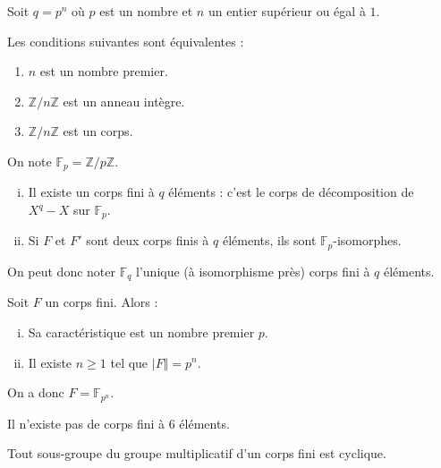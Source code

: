	Soit $q = p^n$ où $p$ est un nombre et $n$ un entier supérieur ou égal à $1$.


	\begin{proposition}
		Les conditions suivantes sont équivalentes :
		\begin{enumerate}
			\item $n$ est un nombre premier.
			\item $\mathbb{Z}/n\mathbb{Z}$ est un anneau intègre.
			\item $\mathbb{Z}/n\mathbb{Z}$ est un corps.
		\end{enumerate}
	\end{proposition}

	\begin{notation}
		On note $\mathbb{F}_p = \mathbb{Z}/p\mathbb{Z}$.
	\end{notation}


	\begin{theorem}
		\begin{enumerate}[(i)]
			\item Il existe un corps fini à $q$ éléments : c'est le corps de décomposition de $X^q - X$ sur $\mathbb{F}_p$.
			\item Si $F$ et $F'$ sont deux corps finis à $q$ éléments, ils sont $\mathbb{F}_p$-isomorphes.
		\end{enumerate}
		On peut donc noter $\mathbb{F}_q$ l'unique (à isomorphisme près) corps fini à $q$ éléments.
	\end{theorem}


	\begin{theorem}
		Soit $F$ un corps fini. Alors :
		\begin{enumerate}[(i)]
			\item Sa caractéristique est un nombre premier $p$.
			\item Il existe $n \geq 1$ tel que $\vert F \Vert = p^n$.
		\end{enumerate}
		On a donc $F = \mathbb{F}_{p^n}$.
	\end{theorem}

	\begin{example}
		Il n'existe pas de corps fini à $6$ éléments.
	\end{example}

	\begin{theorem}
		Tout sous-groupe du groupe multiplicatif d'un corps fini est cyclique.
	\end{theorem}

